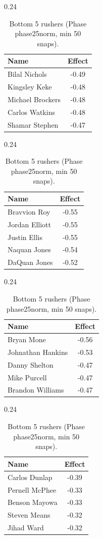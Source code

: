 \begin{table}[h!]
\centering
\begin{subtable}{0.24\textwidth}
\centering
\footnotesize
\begin{tabular}{lc}
\toprule
Name & Effect \\
\midrule
Bilal Nichols & -0.49 \\
Kingsley Keke & -0.48 \\
Michael Brockers & -0.48 \\
Carlos Watkins & -0.48 \\
Shamar Stephen & -0.47 \\
\bottomrule
\end{tabular}
\caption{DE}
\end{subtable}
\hfill
\begin{subtable}{0.24\textwidth}
\centering
\footnotesize
\begin{tabular}{lc}
\toprule
Name & Effect \\
\midrule
Bravvion Roy & -0.55 \\
Jordan Elliott & -0.55 \\
Justin Ellis & -0.55 \\
Naquan Jones & -0.54 \\
DaQuan Jones & -0.52 \\
\bottomrule
\end{tabular}
\caption{DT}
\end{subtable}
\hfill
\begin{subtable}{0.24\textwidth}
\centering
\footnotesize
\begin{tabular}{lc}
\toprule
Name & Effect \\
\midrule
Bryan Mone & -0.56 \\
Johnathan Hankins & -0.53 \\
Danny Shelton & -0.47 \\
Mike Purcell & -0.47 \\
Brandon Williams & -0.47 \\
\bottomrule
\end{tabular}
\caption{NT}
\end{subtable}
\hfill
\begin{subtable}{0.24\textwidth}
\centering
\footnotesize
\begin{tabular}{lc}
\toprule
Name & Effect \\
\midrule
Carlos Dunlap & -0.39 \\
Pernell McPhee & -0.33 \\
Benson Mayowa & -0.33 \\
Steven Means & -0.32 \\
Jihad Ward & -0.32 \\
\bottomrule
\end{tabular}
\caption{OLB}
\end{subtable}
\caption{Bottom 5 rushers (Phase phase25norm, min 50 snaps).}
\label{tab:rusher_pm_phase25norm_bot}
\end{table}
